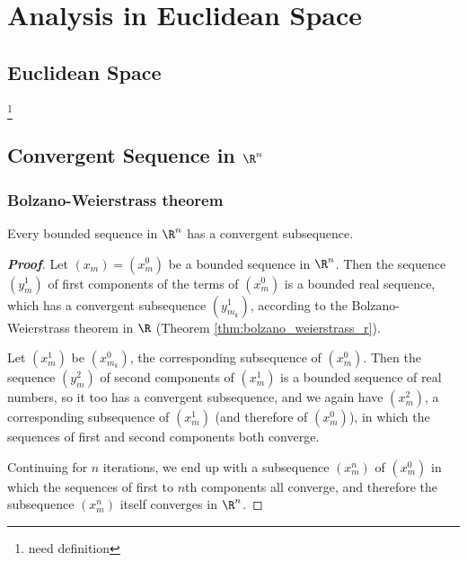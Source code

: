
\chapter{Analysis in Euclidean Space}

\section{Euclidean Space}

\begin{definition}\label{def:euclidean_space}
\footnote{need definition}
\end{definition}



\section{Convergent Sequence in $\R^n$}

\subsection{Bolzano-Weierstrass theorem}

\begin{theorem}\label{thm:bolzano_weierstrass_multiple_real}
Every bounded sequence in $\R^n$ has a convergent subsequence.
\end{theorem}

\begin{proof}[\bf Proof]%
Let $(x_m) = (x_m^0)$ be a bounded sequence in $\R^n$. Then the sequence $(y_m^1)$ of first components of the terms of $(x_m^0)$ is a bounded real sequence, which has a convergent subsequence $(y_{m_k}^1)$, according to the Bolzano-Weierstrass theorem in $\R$ (Theorem \ref{thm:bolzano_weierstrass_r}).
 
Let $(x_{m}^1)$ be $(x_{m_k}^0)$, the corresponding subsequence of $(x_m^0)$. Then the sequence $(y_m^2)$ of second components of $(x_m^1)$ is a bounded sequence of real numbers, so it too has a convergent subsequence, and we again have $(x_{m}^2)$, a corresponding subsequence of $(x_{m}^1)$ (and therefore of $(x_{m}^0)$), in which the sequences of first and second components both converge. 

Continuing for $n$ iterations, we end up with a subsequence $(x_{m}^n)$ of $(x_{m}^0)$ in which the sequences of first to $n$th components all converge, and therefore the subsequence $(x_{m}^n)$ itself converges in $\R^n$.
\end{proof}



